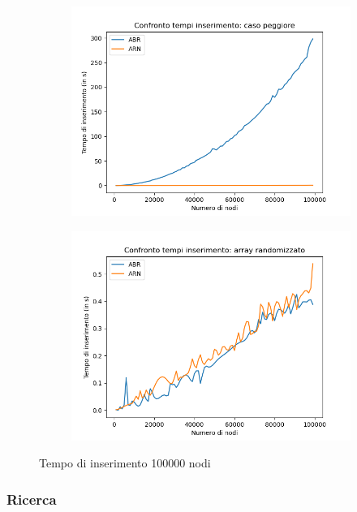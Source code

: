 \documentclass[
]{article}
\begin{document}
\begin{figure}[h!]
	\centering
	\begin{subfigure}[b]{0.4\linewidth}
		\includegraphics[width=\linewidth]{../../img/w_case/ins_100000.png}
	\end{subfigure}
	\begin{subfigure}[b]{0.4\linewidth}
		\includegraphics[width=\linewidth]{../../img/rand/ins_100000.png}
	\end{subfigure}
	\caption{Tempo di inserimento 100000 nodi}
	\label{fig:2}
\end{figure}

\newpage
\hypertarget{ricerca}{%
\subsubsection{Ricerca}\label{ricerca}}
\end{document}
